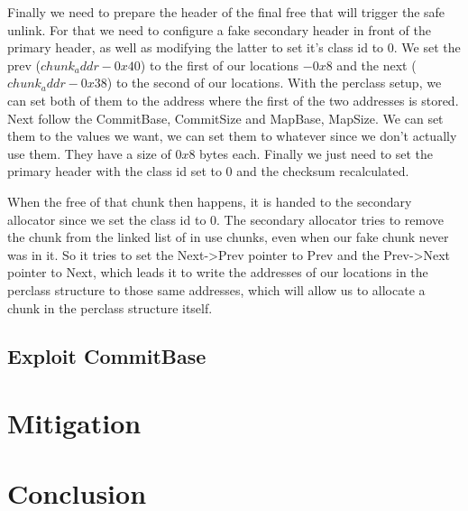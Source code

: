 \documentclass[a4paper,11pt,oneside]{report}
\begin{document}
Finally we need to prepare the header of the final free that will trigger the safe unlink. For that we need to configure a fake secondary header in front of the primary header, as well as modifying the latter to set it's class id to 0. We set the prev ($chunk_addr - 0x40$) to the first of our locations $- 0x8$ and the next ($chunk_addr - 0x38$) to the second of our locations. With the perclass setup, we can set both of them to the address where the first of the two addresses is stored.
Next follow the CommitBase, CommitSize and MapBase, MapSize. We can set them to the values we want, we can set them to whatever since we don't actually use them. They have a size of $0x8$ bytes each.
Finally we just need to set the primary header with the class id set to 0 and the checksum recalculated.

When the free of that chunk then happens, it is handed to the secondary allocator since we set the class id to 0. The secondary allocator tries to remove the chunk from the linked list of in use chunks, even when our fake chunk never was in it. So it tries to set the Next->Prev pointer to Prev and the Prev->Next pointer to Next, which leads it to write the addresses of our locations in the perclass structure to those same addresses, which will allow us to allocate a chunk in the perclass structure itself.



\section{Exploit CommitBase}





\chapter{Mitigation}




\chapter{Conclusion}



\cleardoublepage{}
\printbibliography{}
\end{document}
